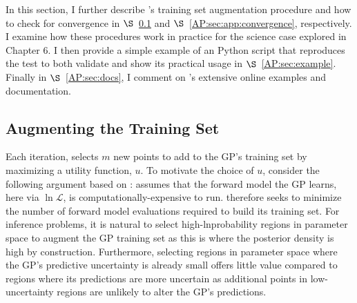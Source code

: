 In this section, I further describe \approxposterior's training set augmentation procedure and how to check for convergence in $\S$~\ref{AP:sec:augment} and $\S$~\ref{AP:sec:app:convergence}, respectively. I examine how these procedures work in practice for the science case explored in Chapter 6.  I then provide a simple example of an \approxposterior Python script that reproduces the \citet{Wang2018} test to both validate \approxposterior and show its practical usage in $\S$~\ref{AP:sec:example}. Finally in $\S$~\ref{AP:sec:docs}, I comment on \approxposterior's extensive online examples and documentation.

\subsection{Augmenting the Training Set} \label{AP:sec:augment}

Each iteration, \approxposterior selects $m$ new points to add to the GP's training set by maximizing a utility function, $u$. To motivate the choice of $u$, consider the following argument based on \citet{Kandasamy2017}: \approxposterior assumes that the forward model the GP learns, here \vplanet via $\ln \mathcal{L}$, is computationally-expensive to run. \approxposterior therefore seeks to minimize the number of forward model evaluations required to build its training set. For inference problems, it is natural to select high-lnprobability regions in parameter space to augment the GP training set as this is where the posterior density is high by construction. Furthermore, selecting regions in parameter space where the GP's predictive uncertainty is already small offers little value compared to regions where its predictions are more uncertain as additional points in low-uncertainty regions are unlikely to alter the GP's predictions. 

